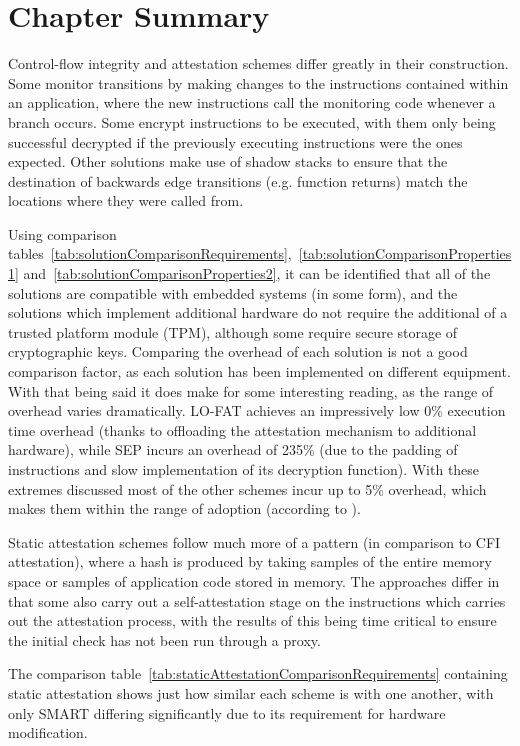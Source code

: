 \section{Chapter Summary}
Control-flow integrity and attestation schemes differ greatly in their construction. Some monitor transitions by making changes to the instructions contained within an application, where the new instructions call the monitoring code whenever a branch occurs. Some encrypt instructions to be executed, with them only being successful decrypted if the previously executing instructions were the ones expected. Other solutions make use of shadow stacks to ensure that the destination of backwards edge transitions (e.g. function returns) match the locations where they were called from.

Using comparison tables~\ref{tab:solutionComparisonRequirements},~\ref{tab:solutionComparisonProperties1} and~\ref{tab:solutionComparisonProperties2}, it can be identified that all of the solutions are compatible with embedded systems (in some form), and the solutions which implement additional hardware do not require the additional of a trusted platform module (TPM), although some require secure storage of cryptographic keys. Comparing the overhead of each solution is not a good comparison factor, as each solution has been implemented on different equipment. With that being said it does make for some interesting reading, as the range of overhead varies dramatically. LO-FAT \cite{Dessouky2017} achieves an impressively low 0\% execution time overhead (thanks to offloading the attestation mechanism to additional hardware), while SEP \cite{Lee2019} incurs an overhead of 235\% (due to the padding of instructions and slow implementation of its decryption function). With these extremes discussed most of the other schemes incur up to 5\% overhead, which makes them within the range of adoption (according to \cite{Szekeres2013}).

Static attestation schemes follow much more of a pattern (in comparison to CFI attestation), where a hash is produced by taking samples of the entire memory space or samples of application code stored in memory. The approaches differ in that some also carry out a self-attestation stage on the instructions which carries out the attestation process, with the results of this being time critical to ensure the initial check has not been run through a proxy.

The comparison table~\ref{tab:staticAttestationComparisonRequirements} containing static attestation shows just how similar each scheme is with one another, with only SMART \cite{For} differing significantly due to its requirement for hardware modification.